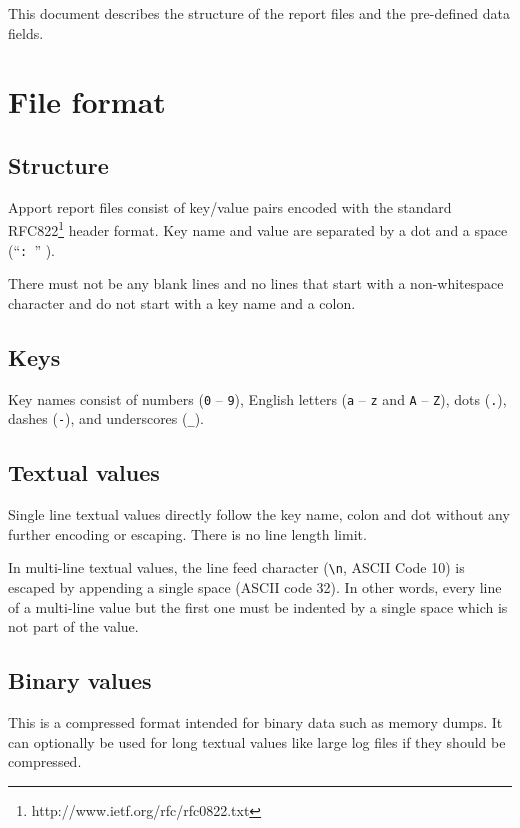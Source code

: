 \documentclass[DIV12,halfparskip]{scrartcl}
\begin{document}
This document describes the structure of the report files and the pre-defined data
fields.

\section{File format}

\subsection{Structure}

Apport report files consist of key/value pairs encoded with the standard
RFC822\footnote{http://www.ietf.org/rfc/rfc0822.txt} header format. Key name
and value are separated by a dot and a space (``\verb!: !'' ).

There must not be any blank lines and no lines that start with a non-whitespace
character and do not start with a key name and a colon.

\subsection{Keys}

Key names consist of numbers (\verb!0! -- \verb!9!), English letters (\verb!a!
-- \verb!z! and \verb!A! -- \verb!Z!), dots (\verb!.!), dashes (\verb!-!), and
underscores (\verb!_!).

\subsection{Textual values}

Single line textual values directly follow the key name, colon and dot without
any further encoding or escaping. There is no line length limit.

In multi-line textual values, the line feed character (\verb!\n!, ASCII Code
10) is escaped by appending a single space (ASCII code 32). In other words,
every line of a multi-line value but the first one must be indented by a single
space which is not part of the value.

\subsection{Binary values}

This is a compressed format intended for binary data such as memory dumps. It
can optionally be used for long textual values like large log files if they
should be compressed.
\end{document}
